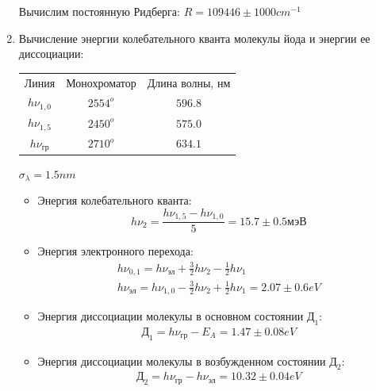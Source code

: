\documentclass[12pt,a4paper]{article}
\begin{document}
\begin{enumerate}
Вычислим постоянную Ридберга:
\textbf{
$R = 109446  \pm 1000 cm^{-1}$
}

\item Вычисление энергии колебательного кванта молекулы йода и энергии ее диссоциации:

\begin{center}
\begin{tabular}{ccc}
Линия & Монохроматор & Длина волны, нм \\
$h \nu_{1,0}$ 	   	& $2554^o$ & $ 596.8 $ \\
$h \nu_{1,5}$ 	   	& $2450^o$ & $ 575.0 $  \\
$h \nu_\text{гр}$ 	& $2710^o$ & $ 634.1 $ \\
\end{tabular}
\end{center}
$\sigma_\lambda = 1.5 nm$ \\
\begin{itemize}

\item Энергия колебательного кванта:
\begin{equation*}
h \nu_2 = \frac{h \nu_{1,5} - h \nu_{1,0}}{5} = 15.7 \pm 0.5 \text{мэВ}
\end{equation*}

\item Энергия электронного перехода:
\begin{gather*}
h \nu_{0, 1} = h \nu_\text{эл} +\frac{3}{2} h \nu_2 - \frac{1}{2} h \nu_1 \\
h \nu_\text{эл} = h \nu_{1, 0} - \frac{3}{2} h \nu_2 + \frac{1}{2} h \nu_1 = 2.07 \pm 0.6 eV
\end{gather*}

\item Энергия диссоциации молекулы в основном состоянии $\text{Д}_1$:
\begin{gather*}
\text{Д}_1 = h \nu_\text{гр} - E_A = 1.47 \pm 0.08 eV
\end{gather*}

\item Энергия диссоциации молекулы в возбужденном состоянии $\text{Д}_2$:
\begin{gather*}
\text{Д}_2 = h \nu_\text{гр} - h \nu_\text{эл} = 10.32 \pm 0.04 eV 
\end{gather*}

\end{itemize}

\end{enumerate}

\newpage
\end{document}
